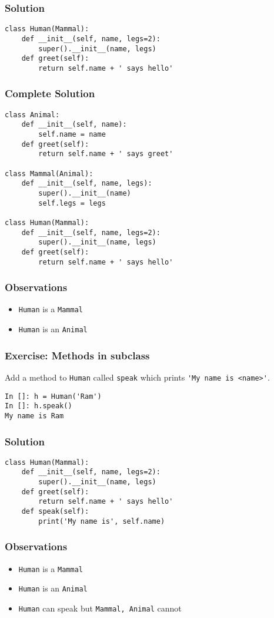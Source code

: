 \documentclass[14pt,compress,aspectratio=169]{beamer}
\newcommand{\py}[1]{\lstinline{#1}}
\begin{document}
\begin{frame}
  \frametitle{Solution}
\begin{lstlisting}
class Human(Mammal):
    def __init__(self, name, legs=2):
        super().__init__(name, legs)
    def greet(self):
        return self.name + ' says hello'
\end{lstlisting}
\end{frame}

\begin{frame}
  \frametitle{Complete Solution}
  \vspace*{-0.1in}
  \small
\begin{lstlisting}
class Animal:
    def __init__(self, name):
        self.name = name
    def greet(self):
        return self.name + ' says greet'

class Mammal(Animal):
    def __init__(self, name, legs):
        super().__init__(name)
        self.legs = legs

class Human(Mammal):
    def __init__(self, name, legs=2):
        super().__init__(name, legs)
    def greet(self):
        return self.name + ' says hello'
\end{lstlisting}
\end{frame}

\begin{frame}
  \frametitle{Observations}
  \begin{itemize}
  \item \py{Human} is a \py{Mammal}
  \item \py{Human} is an \py{Animal}
  \end{itemize}
\end{frame}


\begin{frame}
  \frametitle{Exercise: Methods in subclass}
  \begin{block}{}
    Add a method to \py{Human} called \py{speak} which prints
    \py{'My name is <name>'}.
  \end{block}

\begin{lstlisting}
In []: h = Human('Ram')
In []: h.speak()
My name is Ram
\end{lstlisting}
\end{frame}


\begin{frame}
  \frametitle{Solution}
\begin{lstlisting}
class Human(Mammal):
    def __init__(self, name, legs=2):
        super().__init__(name, legs)
    def greet(self):
        return self.name + ' says hello'
    def speak(self):
        print('My name is', self.name)
\end{lstlisting}
\end{frame}

\begin{frame}
  \frametitle{Observations}
  \begin{itemize}
  \item \py{Human} is a \py{Mammal}
  \item \py{Human} is an \py{Animal}
  \item \py{Human} can speak but \py{Mammal, Animal} cannot
  \end{itemize}
\end{frame}
\end{document}
